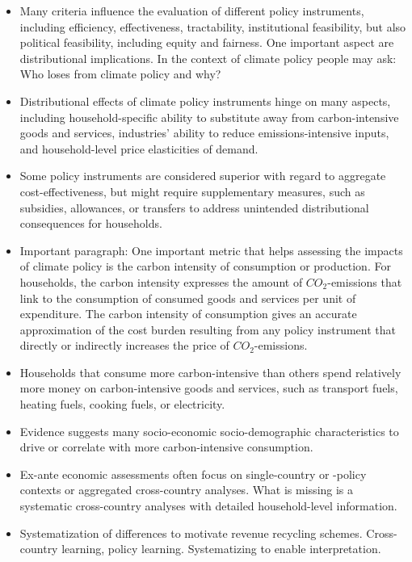\documentclass[12pt, a4paper]{article}
\begin{document}
\begin{itemize}
    
  \item Many criteria influence the evaluation of different policy instruments, including efficiency, effectiveness, tractability, institutional feasibility, but also political feasibility, including equity and fairness. One important aspect are distributional implications. In the context of climate policy people may ask: Who loses from climate policy and why?
  \item Distributional effects of climate policy instruments hinge on many aspects, including household-specific ability to substitute away from carbon-intensive goods and services, industries' ability to reduce emissions-intensive inputs, and household-level price elasticities of demand.
  \item Some policy instruments are considered superior with regard to aggregate cost-effectiveness, but might require supplementary measures, such as subsidies, allowances, or transfers to address unintended distributional consequences for households.
  \item Important paragraph: One important metric that helps assessing the impacts of climate policy is the carbon intensity of consumption or production. For households, the carbon intensity expresses the amount of $CO_{2}$-emissions that link to the consumption of consumed goods and services per unit of expenditure. The carbon intensity of consumption gives an accurate approximation of the cost burden resulting from any policy instrument that directly or indirectly increases the price of $CO_{2}$-emissions.
  \item Households that consume more carbon-intensive than others spend relatively more money on carbon-intensive goods and services, such as transport fuels, heating fuels, cooking fuels, or electricity.
  \item Evidence suggests many socio-economic socio-demographic characteristics to drive or correlate with more carbon-intensive consumption.
  \item Ex-ante economic assessments often focus on single-country or -policy contexts or aggregated cross-country analyses. What is missing is a systematic cross-country analyses with detailed household-level information.
  \item Systematization of differences to motivate revenue recycling schemes. Cross-country learning, policy learning. Systematizing to enable interpretation.
\end{itemize}
\end{document}
